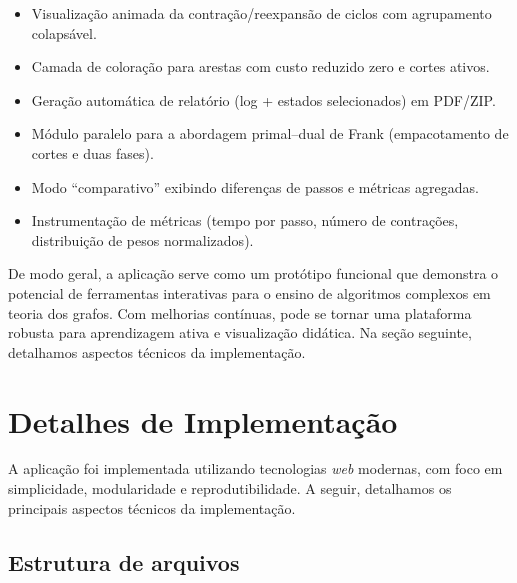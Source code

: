 \begin{itemize}\setlength{\itemsep}{2pt}
	\item Visualização animada da contração/reexpansão de ciclos com agrupamento colapsável.
	\item Camada de coloração para arestas com custo reduzido zero e cortes ativos.
	\item Geração automática de relatório (log + estados selecionados) em PDF/ZIP.
	\item Módulo paralelo para a abordagem primal--dual de Frank (empacotamento de cortes e duas fases).
	\item Modo “comparativo” exibindo diferenças de passos e métricas agregadas.
	\item Instrumentação de métricas (tempo por passo, número de contrações, distribuição de pesos normalizados).
\end{itemize}


De modo geral, a aplicação serve como um protótipo funcional que demonstra o potencial de ferramentas interativas para o ensino de algoritmos complexos em teoria dos grafos. Com melhorias contínuas, pode se tornar uma plataforma robusta para aprendizagem ativa e visualização didática. Na seção seguinte, detalhamos aspectos técnicos da implementação.

\section{Detalhes de Implementação}

A aplicação foi implementada utilizando tecnologias \textit{web} modernas, com foco em simplicidade, modularidade e reprodutibilidade. A seguir, detalhamos os principais aspectos técnicos da implementação.

\subsection{Estrutura de arquivos}

